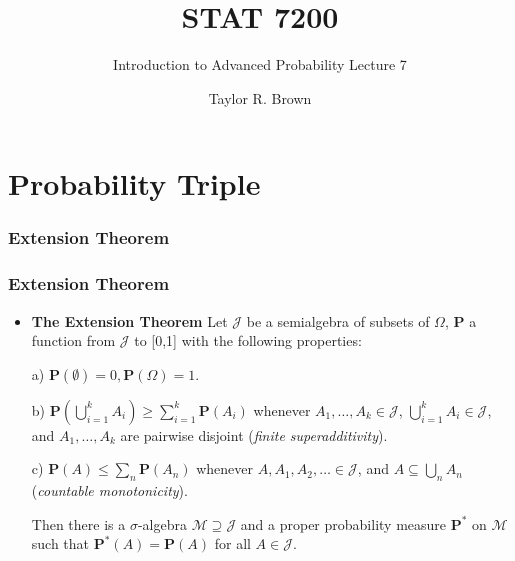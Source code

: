 \documentclass[handout]{beamer}
\title{STAT 7200}
\subtitle{Introduction to Advanced Probability \newline Lecture 7}
\author{Taylor R. Brown}
\institute{}
\date{}
\newcommand{\BP}{\mathbf{P}}
\begin{document}
\frame{\titlepage}

\section[Outline]{}


\section{Probability Triple}

\subsubsection{Extension Theorem}
\frame
{
  \frametitle{Extension Theorem}

   \begin{itemize}

\item<1-> [] \begin{Theorem} \textbf{The Extension Theorem}  Let $\mathcal{J}$ be a semialgebra of subsets of $\Omega$,  $\mathbf{P}$ a function from $\mathcal{J}$  to [0,1] with the following properties:
             \newline
             
a) $\mathbf{P} (\emptyset)=0, \mathbf{P}(\Omega)=1$.
                 \newline
         
b) $\BP(\bigcup_{i=1}^k A_i)\geq \sum_{i=1}^k \BP(A_i)$ whenever $A_1,\ldots,A_k \in\mathcal{J}$, $\bigcup_{i=1}^k A_i  \in\mathcal{J}$, and $A_1,\ldots,A_k$ are pairwise disjoint (\textit{finite superadditivity}).
                   \newline
       
c) $\BP(A)\leq \sum_{n} \BP(A_n)$ whenever $A,A_1,A_2,\ldots \in\mathcal{J}$, and $A\subseteq \bigcup_{n} A_n$ (\textit{countable monotonicity}).               
             \newline
             
Then there is a $\sigma$-algebra $\mathcal{M} \supseteq \mathcal{J}$ and a proper probability measure $\BP^*$ on $\mathcal{M}$ such that $\BP^*(A)=\BP(A)$ for all $A\in \mathcal{J}$.

\end{Theorem}    
       
                
\end{itemize}
}
\end{document}
